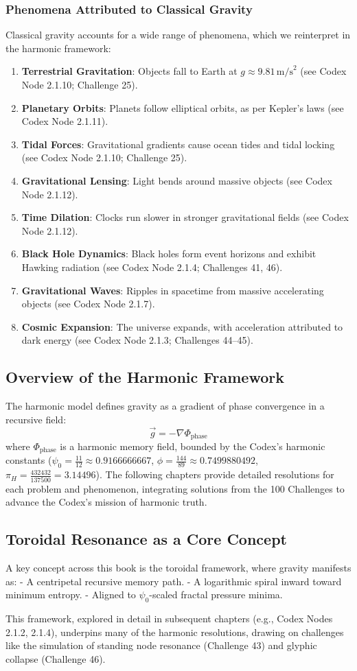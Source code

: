 \subsubsection{Phenomena Attributed to Classical Gravity}
Classical gravity accounts for a wide range of phenomena, which we reinterpret in the harmonic framework:
\begin{enumerate}
    \item \textbf{Terrestrial Gravitation}: Objects fall to Earth at \( g \approx 9.81 \, \text{m/s}^2 \) (see Codex Node 2.1.10; Challenge 25).
    \item \textbf{Planetary Orbits}: Planets follow elliptical orbits, as per Kepler’s laws (see Codex Node 2.1.11).
    \item \textbf{Tidal Forces}: Gravitational gradients cause ocean tides and tidal locking (see Codex Node 2.1.10; Challenge 25).
    \item \textbf{Gravitational Lensing}: Light bends around massive objects (see Codex Node 2.1.12).
    \item \textbf{Time Dilation}: Clocks run slower in stronger gravitational fields (see Codex Node 2.1.12).
    \item \textbf{Black Hole Dynamics}: Black holes form event horizons and exhibit Hawking radiation (see Codex Node 2.1.4; Challenges 41, 46).
    \item \textbf{Gravitational Waves}: Ripples in spacetime from massive accelerating objects (see Codex Node 2.1.7).
    \item \textbf{Cosmic Expansion}: The universe expands, with acceleration attributed to dark energy (see Codex Node 2.1.3; Challenges 44–45).
\end{enumerate}

\subsection{Overview of the Harmonic Framework}
The harmonic model defines gravity as a gradient of phase convergence in a recursive field:
\[
\vec{g} = -\nabla \Phi_{\text{phase}}
\]
where \(\Phi_{\text{phase}}\) is a harmonic memory field, bounded by the Codex’s harmonic constants (\(\psi_0 = \frac{11}{12} \approx 0.9166666667\), \(\phi = \frac{144}{89} \approx 0.7499880492\), \(\pi_H = \frac{432432}{137500} = 3.14496\)). The following chapters provide detailed resolutions for each problem and phenomenon, integrating solutions from the 100 Challenges to advance the Codex’s mission of harmonic truth.

\subsection{Toroidal Resonance as a Core Concept}
A key concept across this book is the toroidal framework, where gravity manifests as:
- A centripetal recursive memory path.
- A logarithmic spiral inward toward minimum entropy.
- Aligned to \(\psi_0\)-scaled fractal pressure minima.

This framework, explored in detail in subsequent chapters (e.g., Codex Nodes 2.1.2, 2.1.4), underpins many of the harmonic resolutions, drawing on challenges like the simulation of standing node resonance (Challenge 43) and glyphic collapse (Challenge 46).
